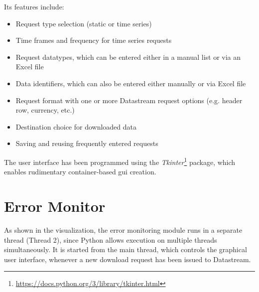 Its features include: 
\begin{itemize}
	\item Request type selection (static or time series)
	\item Time frames and frequency for time series requests
	\item Request datatypes, which can be entered either in a manual list or via an Excel file
	\item Data identifiers, which can also be entered either manually or via Excel file
	\item Request format with one or more Datastream request options (e.g. header row, currency, etc.)
	\item Destination choice for downloaded data
	\item Saving and reusing frequently entered requests
\end{itemize}

The user interface has been programmed using the \textit{Tkinter}\footnote{\url{https://docs.python.org/3/library/tkinter.html}} package, which enables rudimentary container-based gui creation. 



\section{Error Monitor} \label{section:error-monitor}
As shown in the visualization, the error monitoring module runs in a separate thread (Thread 2), since Python allows execution on multiple threads simultaneously. It is started from the main thread, which controls the graphical user interface, whenever a new download request has been issued to Datastream. 

